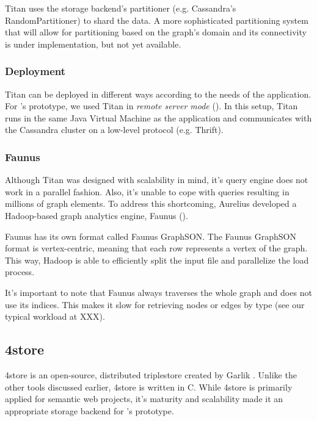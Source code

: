 Titan uses the storage backend's partitioner (e.g. Cassandra's RandomPartitioner) to shard the data. A more sophisticated partitioning system that will allow for partitioning based on the graph's domain and its connectivity is under implementation, but not yet available.


\subsubsection{Deployment}

Titan can be deployed in different ways according to the needs of the application. For \iqd's prototype, we used Titan in \textit{remote server mode} (). In this setup, Titan runs in the same Java Virtual Machine as the application and communicates with the Cassandra cluster on a low-level protocol (e.g. Thrift).


\subsubsection{Faunus}

Although Titan was designed with scalability in mind, it's query engine does not work in a parallel fashion. Also, it's unable to cope with queries resulting in millions of graph elements. To address this shortcoming, Aurelius developed a Hadoop-based graph analytics engine, Faunus ().

Faunus has its own format called Faunus GraphSON. The Faunus GraphSON format is vertex-centric, meaning that each row represents a vertex of the graph. This way, Hadoop is able to efficiently split the input file and parallelize the load process.


It's important to note that Faunus always traverses the whole graph and does not use its indices. This makes it slow for retrieving nodes or edges by type (see our typical workload at XXX).

\subsection{4store}

4store is an open-source, distributed triplestore created by Garlik \cite{4store}. Unlike the other tools discussed earlier, 4store is written in C. While 4store is primarily applied for semantic web projects, it's maturity and scalability made it an appropriate storage backend for \iqd's prototype.


